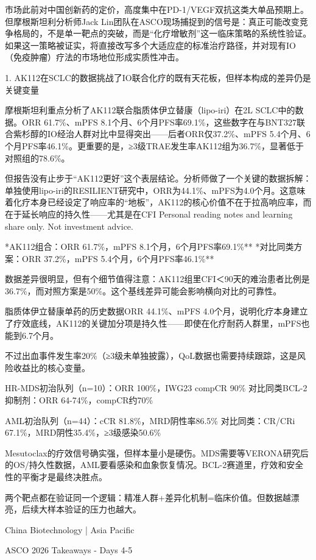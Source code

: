 \documentclass[11pt]{ctexart}
\begin{document}
市场此前对中国创新药的定价，高度集中在PD-1/VEGF双抗这类大单品预期上。但摩根斯坦利分析师Jack Lin团队在ASCO现场捕捉到的信号是：真正可能改变竞争格局的，不是单一靶点的突破，而是“化疗增敏剂”这一临床策略的系统性验证。如果这一策略被证实，将直接改写多个大适应症的标准治疗路径，并对现有IO（免疫肿瘤）疗法的市场地位形成实质性冲击。

1. AK112在SCLC的数据挑战了IO联合化疗的既有天花板，但样本构成的差异仍是关键变量

摩根斯坦利重点分析了AK112联合脂质体伊立替康（lipo-iri）在2L SCLC中的数据。ORR 61.7\%、mPFS 8.1个月、6个月PFS率69.1\%，这些数字在与BNT327联合紫杉醇的IO经治人群对比中显得突出——后者ORR仅37.2\%、mPFS 5.4个月、6个月PFS率46.1\%。更重要的是，≥3级TRAE发生率AK112组为36.7\%，显著低于对照组的78.6\%。

但报告没有止步于“AK112更好”这个表层结论。分析师做了一个关键的数据拆解：单独使用lipo-iri的RESILIENT研究中，ORR为44.1\%、mPFS为4.0个月。这意味着化疗本身已经设定了响应率的“地板”，AK112的核心价值不在于拉高响应率，而在于延长响应的持久性——尤其是在CFI Personal reading notes and learning share only. Not investment advice.

*AK112组合：ORR 61.7\%，mPFS 8.1个月，6个月PFS率69.1\%** *对比同类方案：ORR 37.2\%，mPFS 5.4个月，6个月PFS率46.1\%**

数据差异很明显，但有个细节值得注意：AK112组里CFI＜90天的难治患者比例是36.7\%，而对照方案是50\%。这个基线差异可能会影响横向对比的可靠性。

脂质体伊立替康单药的历史数据ORR 44.1\%、mPFS 4.0个月，说明化疗本身建立了疗效底线，AK112的关键加分项是持久性——即使在化疗耐药人群里，mPFS也能到6.7个月。

不过出血事件发生率20\%（≥3级未单独披露），QoL数据也需要持续跟踪，这是风险收益比的核心变量。

HR-MDS初治队列（n=10）：ORR 100\%，IWG23 compCR 90\% 对比同类BCL-2抑制剂：ORR 64-74\%，compCR约70\%

AML初治队列（n=44）：cCR 81.8\%，MRD阴性率86.5\% 对比同类：CR/CRi 67.1\%，MRD阴性35.4\%，≥3级感染50.6\%

Mesutoclax的疗效信号确实强，但样本量小是硬伤。MDS需要等VERONA研究后的OS/持久性数据，AML要看感染和血象恢复情况。BCL-2赛道里，疗效和安全性的平衡才是最终决胜点。

两个靶点都在验证同一个逻辑：精准人群+差异化机制=临床价值。但数据越漂亮，后续大样本验证的压力也越大。

China Biotechnology | Asia Pacific

ASCO 2026 Takeaways - Days 4-5
\end{document}
